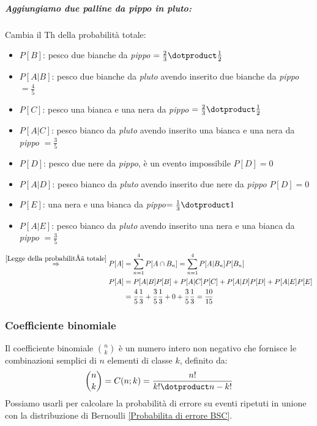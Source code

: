                 \subparagraph{Aggiungiamo due palline da \emph{pippo} in \emph{pluto}:} Cambia il Th della probabilità totale:
                    \begin{itemize}
                        \item {$P[B]$: pesco due bianche da \emph{pippo} $= \frac{2}{3}\dotproduct \frac{1}{2} $}
                        \item {$P[A|B]$: pesco due bianche da \emph{pluto} avendo inserito due bianche da \emph{pippo}$= \frac{4}{5} $}
                        \item {$P[C]$: pesco una bianca e una nera da \emph{pippo} $= \frac{2}{3}\dotproduct \frac{1}{2} $}
                        \item {$P[A|C]$: pesco bianco da \emph{pluto} avendo inserito una bianca e una nera da \emph{pippo} $= \frac{3}{5} $}
                        \item {$P[D]$: pesco due nere da \emph{pippo}, è un evento impossibile $P[D] = 0$}
                        \item {$P[A|D]$: pesco bianco da \emph{pluto} avendo inserito due nere da \emph{pippo} $P[D] = 0$}
                        \item {$P[E]$: una nera e una bianca da \emph{pippo}$= \frac{1}{3}\dotproduct 1 $}
                        \item {$P[A|E]$: pesco bianco da \emph{pluto} avendo inserito una nera e una bianca da \emph{pippo} $= \frac{3}{5} $}
                    \end{itemize}
                    \begin{align}
                        \overset{\ref{Legge della probabilità totale}}{\Rightarrow} P[A] &= \sum_{n=1}^{4} P[A\cap B_n] = \sum_{n=1}^{4} P[A|B_n] P[B_n] \nonumber \\
                        P[A] &= P[A|B]P[B] + P[A|C]P[C]+ P[A|D]P[D]+ P[A|E]P[E] \nonumber \\
                        &= \frac{4}{5}\frac{1}{3} + \frac{3}{5}\frac{1}{3} + 0 + \frac{3}{5}\frac{1}{3} = \frac{10}{15}  \nonumber       
                    \end{align}
        \subsubsection{Coefficiente binomiale}\label{Coefficiente binomiale}
            Il coefficiente binomiale $\binom{n}{k}$ è un numero intero non negativo che fornisce le combinazioni semplici di $n$ elementi di classe $k$,
            definito da:
            \[
                \binom{n}{k} = C(n;k) = \frac{n!}{k!\dotproduct n-k!}
            \]
            Possiamo usarli per calcolare la probabilità di errore su eventi ripetuti in unione con la distribuzione di Bernoulli \ref{Probabilita di errore BSC}.
